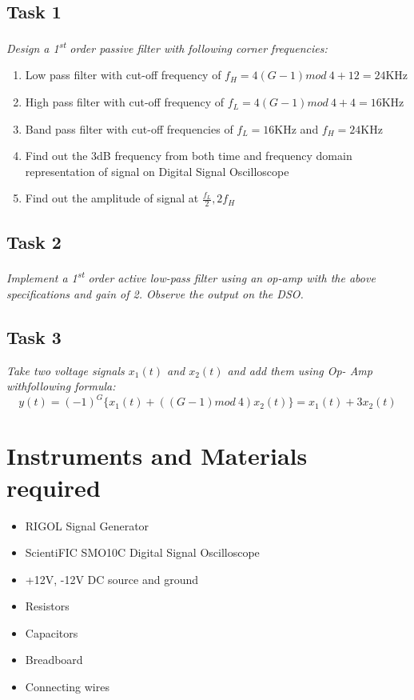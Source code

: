 \documentclass{article}
\begin{document}
\subsection{Task 1}
\emph{Design a 1\textsuperscript{st} order passive filter with following corner frequencies:}
  \begin{enumerate}
    \item Low pass filter with cut-off frequency of $f_H = 4{(G-1) mod\ 4} +12 = 24$KHz
    \item High pass filter with cut-off frequency of $f_L = 4{(G-1) mod\ 4} +4 = 16$KHz
    \item Band pass filter with cut-off frequencies of $f_L= 16$KHz and $f_H = 24$KHz
    \item Find out the 3dB frequency from both time and frequency domain representation of signal on Digital Signal Oscilloscope
    \item Find out the amplitude of signal at $\frac{f_L}{2}, 2f_H$
  \end{enumerate}

\subsection{Task 2}
  \emph{Implement a 1\textsuperscript{st} order active low-pass filter using an op-amp with the above specifications and gain of 2. Observe the output on the DSO.}

\subsection{Task 3}
\emph{Take two voltage signals $x_1(t)$ and $x_2(t)$ and add them using Op-
Amp withfollowing formula:}
$$
y(t) = (-1)^{G}\{x_1(t) + ((G-1) mod\ 4 )x_2(t)\} = x_1(t)+3x_2(t)
$$

\section{Instruments and Materials required}
\begin{itemize}
  \item RIGOL Signal Generator
  \item ScientiFIC SMO10C Digital Signal Oscilloscope
  \item +12V, -12V DC source and ground
  \item Resistors
  \item Capacitors
  \item Breadboard
  \item Connecting wires
\end{itemize}
\end{document}
